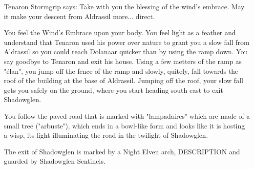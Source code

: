 Tenaron Stormgrip says: Take with you the blessing of the wind's embrace. May it make your descent from Aldrassil more... direct.

You feel the Wind's Embrace upon your body. You feel light as a feather and understand that Tenaron used his power over nature to grant you a slow fall from Aldrassil so you could reach Dolanaar quicker than by using the ramp down. You say goodbye to Tenaron and exit his house. Using a few metters of the ramp as "élan", you jump off the fence of the ramp and slowly, quitely, fall towards the roof of the building at the base of Aldrassil. %
Jumping off the roof, your slow fall gets you safely on the ground, where you start heading south east to exit Shadowglen. %

You follow the paved road that is marked with "lampadaires" which are made of a small tree ("arbuste"), which ends in a bowl-like form and looks like it is hosting a wisp, its light illuminating the road in the twilight of Shadowglen.

The exit of Shadowglen is marked by a Night Elven arch, DESCRIPTION and guarded by Shadowglen Sentinels.
